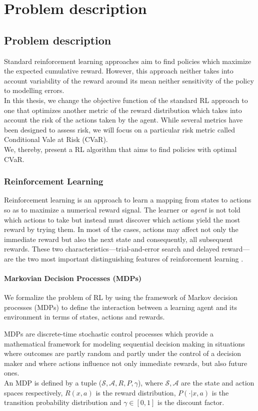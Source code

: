 \chapter{Problem description}
\label{sec:problem_description}
\section{Problem description}

Standard reinforcement learning approaches aim to find policies which maximize the expected cumulative reward.
However, this approach neither takes into account variability of the reward around its mean
neither sensitivity of the policy to modelling errors.\\
In this thesis, we change the objective function of the
standard RL approach to one that optimizes another metric of the reward distribution which
takes into account the risk of the actions taken by the agent.
While several metrics have been designed to assess risk, we will focus on a particular risk metric
called Conditional Vale at Risk (CVaR).\\
We, thereby, present a RL algorithm that aims to find policies with optimal CVaR.

\subsection{Reinforcement Learning}

Reinforcement learning is an approach to learn a mapping from states to actions so as to maximize 
a numerical reward signal. The learner or \textit{agent} is not told which actions to take
but instead must discover which actions yield the most reward by trying them. In most of the cases,
actions may affect not only the immediate reward but also the next state and consequently, all subsequent rewards.
These two characteristics—trial-and-error search and delayed reward—are the two most important
distinguishing features of reinforcement learning \cite{Sutton1998}.

\subsubsection{Markovian Decision Processes (MDPs)}
We formalize the problem of RL by using the framework of Markov decision processes (MDPs)
to define the interaction between a learning agent and its environment in terms of states,
actions and rewards.

MDPs  are discrete-time stochastic control processes which provide a
mathematical framework for modeling sequential decision making in situations where outcomes are
partly random and partly under the control of a decision maker and where actions influence not only immediate rewards,
but also future ones.\\
An MDP is defined by a tuple ($\mathcal{S,A},R,P,\gamma$), where $\mathcal{S,A}$ are the
state and action spaces respectively, $R(x,a)$ is the reward distribution, $P(\cdot |x,a)$ is
the transition probability distribution and $\gamma \in [0,1]$ is the discount factor. 

